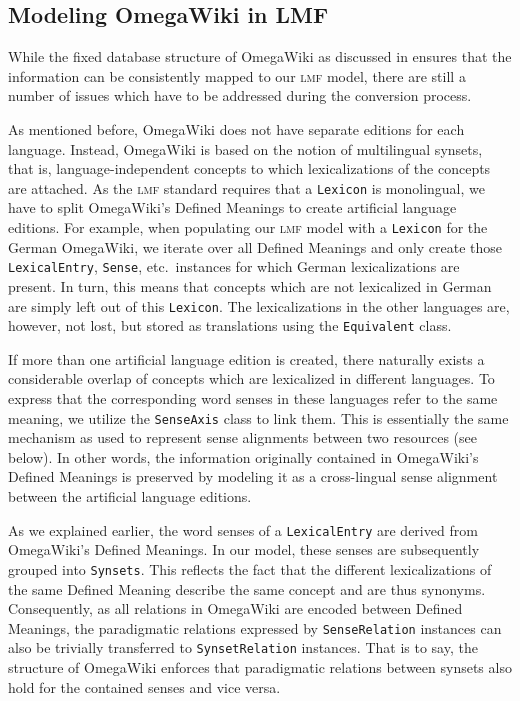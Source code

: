 \documentclass[output=paper]{LSP/langsci}
\begin{document}
\subsection{Modeling OmegaWiki in LMF}

While the fixed database structure of OmegaWiki as discussed in  ensures that the information can be consistently mapped to our \textsc{lmf} model,  there are still a number of issues which have to be addressed during the conversion process.

\begin{description}\sloppy
\item[Splitting Defined Meanings.]
As mentioned before, OmegaWiki does not have separate editions for each language. Instead, OmegaWiki is based on the notion of multilingual synsets, that is, language-independent concepts to which lexicalizations of the concepts are attached. As the \textsc{lmf} standard requires that a \texttt{Lexicon} is monolingual, we have to split OmegaWiki's Defined Meanings to create artificial language editions. For example, when populating our \textsc{lmf} model with a  \texttt{Lexicon} for the German OmegaWiki, we iterate over all Defined Meanings and only create those  \texttt{LexicalEntry}, \texttt{Sense}, etc.\ instances for which German lexicalizations are present. In turn, this means that concepts which are not lexicalized in German are simply left out of this \texttt{Lexicon}. The lexicalizations in the other languages are, however, not lost, but stored as translations using the \texttt{Equivalent} class. 

If more than one artificial language edition is created, there naturally exists a considerable overlap of concepts which are lexicalized in different languages. To express that the corresponding word senses in these languages refer to the same meaning, we utilize the \texttt{SenseAxis} class to link them. This is essentially the same mechanism as used to represent sense alignments between two resources (see  below). In other words, the information originally contained in OmegaWiki's Defined Meanings is preserved by modeling it as a cross-lingual sense alignment between the artificial language editions.


\item[Synsets and Synset Relations.]
As we explained earlier, the word senses of a \texttt{Lexical\-Entry} are derived from OmegaWiki's Defined Meanings. In our model, these senses are subsequently grouped into \texttt{Synsets}. This reflects the fact that the different lexicalizations of the same Defined Meaning describe the same concept and are thus synonyms. Consequently, as all relations in OmegaWiki are encoded between Defined Meanings, the paradigmatic relations expressed by \texttt{SenseRelation} instances can also be trivially transferred to \texttt{SynsetRelation} instances. That is to say, the structure of Omega\-Wi\-ki enforces that paradigmatic relations between synsets also hold for the contained senses and vice versa.


\end{description}
\end{document}
